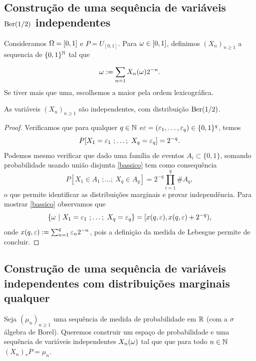 \subsection{Construção de uma sequência de variáveis $\operatorname{Ber}(1/2)$ independentes}

 Consideramos $\Omega=[0,1]$ e $P=U_{[0,1]}$.
 Para $\omega\in[0,1]$, definimos $(X_n)_{n\ge 1}$ a sequencia de $\{0,1\}^{{\mathbb N}}$ tal que

 \begin{equation}\label{eq:deco}
 \omega:= \sum_{n=1} X_n(\omega)2^{-n}.
 \end{equation}
 Se tiver mais que uma, escolhemos a maior pela ordem lexicográfica.

 \begin{proposition}

 As variáveis $(X_n)_{n\ge 1}$ são independentes, com distribuição $\operatorname{Ber}(1/2)$.

 \end{proposition}


 \begin{proof}
Verificamos que para qualquer $q\in {\ensuremath{\mathbb N}}$ e$\varepsilon=(\varepsilon_1,\dots,\varepsilon_q)\in \{0,1\}^q$,
  temos
    \begin{equation}\label{bassico}
   P[X_{1}=\varepsilon_1\ ;\dots; \ X_{q}=\varepsilon_q]=2^{-q}.
  \end{equation}
Podemos mesmo verificar que dado uma família de eventos $A_i\subset \{0,1\}$, somando probabilidade usando união disjunta \eqref{bassico} tem como consequência
   \begin{equation}
   P[X_{1}\in A_1 \ ;\dots; \ X_{q}\in A_q]=2^{-q} \prod_{i=1}^q \# A_q,
  \end{equation}
  o que permite identificar as distribuições marginais e provar independência.
Para mostrar \eqref{bassico} observamos que
  $$ \{ \go \ | \ X_{1}=\gep_1\ ;\dots; \ X_{q}=\gep_q \}= [x(q,\gep),x(q,\gep)+2^{-q}),$$
  onde $x(q,\varepsilon):=\sum_{n=1}^q \varepsilon_n 2^{-n}$, pois
a definição da medida de Lebesgue permite de concluir.


  \end{proof}





 \subsection{Construção de uma sequência de variáveis independentes com distribuições marginais qualquer}

Seja $(\mu_n)_{n\ge 1}$ uma sequência de medida de probabilidade em ${\mathbb R}$ (com a $\sigma$ álgebra de Borel).
Queremos construir um espaço de probabilidade e uma sequência de variáveis independentes $X_n(\omega)$ tal que que para todo $n\in{\ensuremath{\mathbb N}}$
$(X_n)_*P=\mu_n$.


